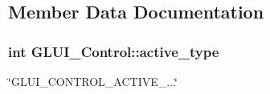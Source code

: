 \subsection{Member Data Documentation}
\hypertarget{class_g_l_u_i___control_ab9864db034526ddd5bbff94a5fb3ee9b}{
\subsubsection[{active\+\_\+type}]{\setlength{\rightskip}{0pt plus 5cm}int G\+L\+U\+I\+\_\+\+Control\+::active\+\_\+type}}\label{class_g_l_u_i___control_ab9864db034526ddd5bbff94a5fb3ee9b}


\char`\"{}\+G\+L\+U\+I\+\_\+\+C\+O\+N\+T\+R\+O\+L\+\_\+\+A\+C\+T\+I\+V\+E\+\_\+...\char`\"{} 

